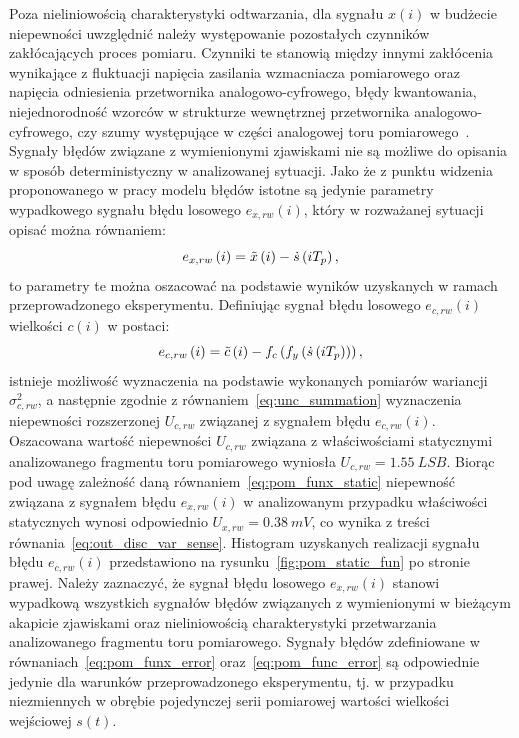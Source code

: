 Poza nieliniowością charakterystyki odtwarzania, dla sygnału $x(i)$ w budżecie niepewności uwzględnić należy występowanie pozostałych czynników zakłócających proces pomiaru. Czynniki te stanowią między innymi zakłócenia wynikające z fluktuacji napięcia zasilania wzmacniacza pomiarowego oraz napięcia odniesienia przetwornika analogowo-cyfrowego, błędy kwantowania, niejednorodność wzorców w strukturze wewnętrznej przetwornika analogowo-cyfrowego, czy szumy występujące w części analogowej toru pomiarowego~\cite{stm_adc}. Sygnały błędów związane z wymienionymi zjawiskami nie są możliwe do opisania w sposób deterministyczny w analizowanej sytuacji. Jako że z punktu widzenia proponowanego w pracy modelu błędów istotne są jedynie parametry wypadkowego sygnału błędu losowego $e_{x,rw}(i)$, który w rozważanej sytuacji opisać można równaniem:
\begin{equation}
e_{x,rw} \left(i\right) = \tilde{x} \left(i\right) - \dot{s} \left(iT_{p}\right) \label{eq:pom_funx_error},
\end{equation}
to parametry te można oszacować na podstawie wyników uzyskanych w ramach przeprowadzonego eksperymentu. Definiując sygnał błędu losowego $e_{c,rw}(i)$ wielkości $c(i)$ w postaci:
\begin{equation}
e_{c,rw} \left(i\right) = \tilde{c} \left(i\right) - f_{c} \left(f_{y} \left(\dot{s} \left(iT_{p}\right)\right)\right) \label{eq:pom_func_error},
\end{equation}
istnieje możliwość wyznaczenia na podstawie wykonanych pomiarów wariancji $\sigma_{c,rw}^{2}$, a następnie zgodnie z równaniem~\eqref{eq:unc_summation} wyznaczenia niepewności rozszerzonej $U_{c,rw}$ związanej z sygnałem błędu $e_{c,rw}(i)$. Oszacowana wartość niepewności $U_{c,rw}$ związana z właściwościami statycznymi analizowanego fragmentu toru pomiarowego wyniosła $U_{c,rw} = \qty{1.55}{LSB}$. Biorąc pod uwagę zależność daną równaniem~\eqref{eq:pom_funx_static} niepewność związana z sygnałem błędu $e_{x,rw}(i)$ w analizowanym przypadku właściwości statycznych wynosi odpowiednio $U_{x,rw} = \qty{0.38}{mV}$, co wynika z treści równania~\eqref{eq:out_disc_var_sense}. Histogram uzyskanych realizacji sygnału błędu $e_{c,rw}(i)$ przedstawiono na rysunku~\ref{fig:pom_static_fun} po stronie prawej. Należy zaznaczyć, że sygnał błędu losowego $e_{x,rw}(i)$ stanowi wypadkową wszystkich sygnałów błędów związanych z wymienionymi w bieżącym akapicie zjawiskami oraz nieliniowością charakterystyki przetwarzania analizowanego fragmentu toru pomiarowego. Sygnały błędów zdefiniowane w równaniach~\eqref{eq:pom_funx_error} oraz~\eqref{eq:pom_func_error} są odpowiednie jedynie dla warunków przeprowadzonego eksperymentu, tj. w przypadku niezmiennych w obrębie pojedynczej serii pomiarowej wartości wielkości wejściowej $s(t)$.

